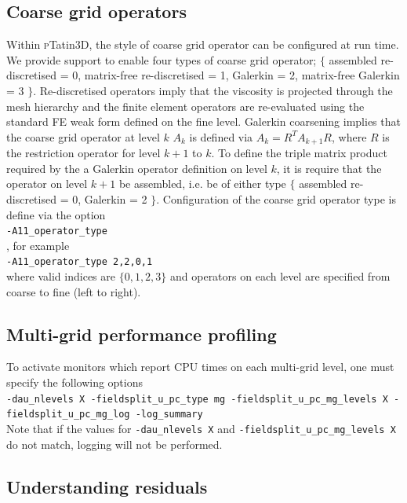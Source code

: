 \documentclass[paper=a4, fontsize=11pt,twoside]{scrartcl}
\newcommand{\ptat}{{{\textsc pTatin3D}}}
\newcommand{\shellcmd}[1]{\\\indent\indent\texttt{\hspace{5mm}\footnotesize #1}\\}
\newcommand{\unix}[1]{\texttt{\footnotesize #1}}
\begin{document}
{{\subsection{Coarse grid operators}
Within {\ptat}, the style of coarse grid operator can be configured at run time. 
We provide support to enable four types of coarse grid operator; $\{$ assembled re-discretised = 0, matrix-free re-discretised = 1, Galerkin = 2, matrix-free Galerkin = 3 $\}$. 
Re-discretised operators imply that the viscosity is projected through the mesh hierarchy and the finite element operators are re-evaluated using the standard FE weak form defined on the fine level. 
Galerkin coarsening implies that the coarse grid operator at level $k$ $A_k$ is defined via $A_k = R^T A_{k+1} R$, where $R$ is the restriction operator for level $k+1$ to $k$. 
To define the triple matrix product required by the a Galerkin operator definition on level $k$, it is require that the operator on level $k+1$ be assembled, i.e. be of either type $\{$ assembled re-discretised = 0, Galerkin = 2 $\}$. Configuration of the coarse grid operator type is define via the option \shellcmd{-A11\_operator\_type}, for example
\shellcmd{-A11\_operator\_type 2,2,0,1}
where valid indices are $\{ 0, 1, 2, 3 \}$ and operators on each level are specified from coarse to fine (left to right).

\subsection{Multi-grid performance profiling}
To activate monitors which report CPU times on each multi-grid level, one must specify the following options
\shellcmd{-dau\_nlevels X -fieldsplit\_u\_pc\_type mg -fieldsplit\_u\_pc\_mg\_levels X -fieldsplit\_u\_pc\_mg\_log -log\_summary}
Note that if the values for \unix{-dau\_nlevels X} and \unix{-fieldsplit\_u\_pc\_mg\_levels X} do not match, logging will not be performed.


\subsection{Understanding residuals}

}}
\end{document}
